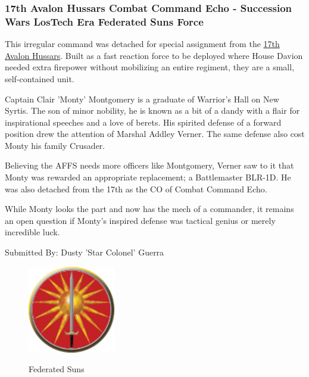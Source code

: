 \subsubsection{17th Avalon Hussars Combat Command Echo - Succession Wars LosTech Era Federated Suns Force}

This irregular command was detached for special assignment from the \href{https://www.sarna.net/wiki/17th_Avalon_Hussars}{17th Avalon Hussars}.
Built as a fast reaction force to be deployed where House Davion needed extra firepower without mobilizing an entire regiment, they are a small, self-contained unit.

Captain Clair 'Monty' Montgomery is a graduate of Warrior's Hall on New Syrtis.
The son of minor nobility, he is known as a bit of a dandy with a flair for inspirational speeches and a love of berets.
His spirited defense of a forward position drew the attention of Marshal Addley Verner.
The same defense also cost Monty his family Crusader.

Believing the AFFS needs more officers like Montgomery, Verner saw to it that Monty was rewarded an appropriate replacement; a Battlemaster BLR-1D.
He was also detached from the 17th as the CO of Combat Command Echo. 
 
While Monty looks the part and now has the mech of a commander, it remains an open question if Monty’s inspired defense was tactical genius or merely incredible luck.

Submitted By: Dusty 'Star Colonel' Guerra

\begin{figure}[!h]
  \centering
  \includegraphics[alt='Federated Suns Logo', width=1.5in, height=1.5in]{img/Federated-Suns.png}
  \caption*{Federated Suns}
\end{figure}

